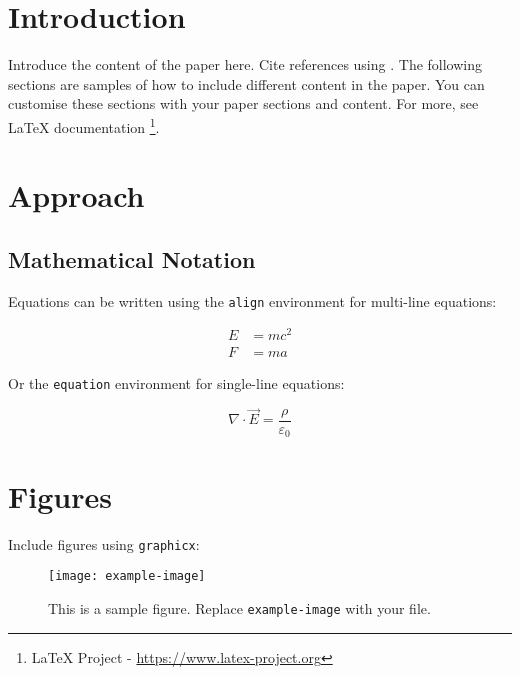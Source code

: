 \documentclass[twoside]{article}
\title{\customtitle{Your Paper Title}}
\author{
    Author One$^1$, Author Two$^2$, Author Three$^1$ \\
    {$^1$Affiliation One, $^2$Affiliation Two} \\
    \texttt{author.one@example.com, author.two@example.com, author.three@example.com}
}
\date{}
\begin{document}
\maketitle

\begin{abstract}
This is the abstract. It summarises the paper's key contributions in a maximum of 200 words.
\end{abstract}


\section{Introduction}

Introduce the content of the paper here. Cite references using \cite{example}. The following sections are samples of how to include different content in the paper. You can customise these sections with your paper sections and content. For more, see LaTeX documentation \footnote{LaTeX Project - \url{https://www.latex-project.org}}.


\section{Approach}

\subsection{Mathematical Notation}

Equations can be written using the \texttt{align} environment for multi-line equations:

\begin{align}
    E &= mc^2 \\
    F &= ma
\end{align}

Or the \texttt{equation} environment for single-line equations:

\begin{equation}
    \nabla \cdot \vec{E} = \frac{\rho}{\varepsilon_0}
\end{equation}

\section{Figures}

Include figures using \texttt{graphicx}:

\begin{figure}[ht]
    \centering
    \texttt{[image: example-image]}
    \caption{This is a sample figure. Replace \texttt{example-image} with your file.}
    \label{fig:example}
\end{figure}
\end{document}
